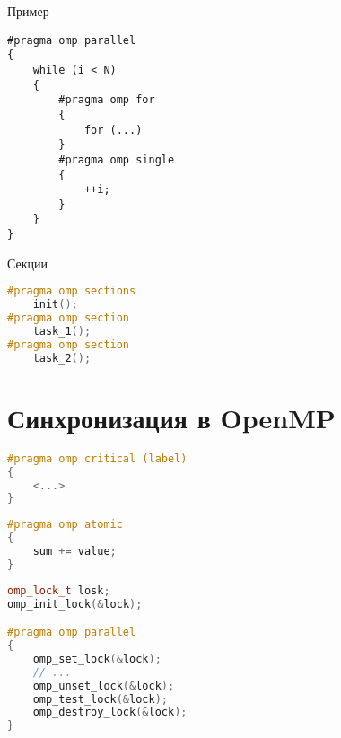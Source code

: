 \begin{frame}[fragile]{Пример}

\begin{lstlisting}
#pragma omp parallel
{
    while (i < N)
    {
        #pragma omp for
        {
            for (...)
        }
        #pragma omp single
        {
            ++i;
        }
    }
}
\end{lstlisting}

\end{frame}

\begin{frame}[fragile]{Секции}

\begin{lstlisting}[language=C++,basicstyle=\ttfamily,keywordstyle=\color{blue},basicstyle=\scriptsize]
#pragma omp sections
    init();
#pragma omp section
    task_1();
#pragma omp section
    task_2();
\end{lstlisting}

\end{frame}

\section{Синхронизация в OpenMP}

\begin{frame}[fragile]

\begin{lstlisting}[language=C++,basicstyle=\ttfamily,keywordstyle=\color{blue},basicstyle=\scriptsize]
#pragma omp critical (label)
{
    <...>
}
\end{lstlisting}

\end{frame}

\begin{frame}[fragile]

\begin{lstlisting}[language=C++,basicstyle=\ttfamily,keywordstyle=\color{blue},basicstyle=\scriptsize]
#pragma omp atomic
{
    sum += value;
}
\end{lstlisting}

\end{frame}

\begin{frame}[fragile]

\begin{lstlisting}[language=C++,basicstyle=\ttfamily,keywordstyle=\color{blue},basicstyle=\scriptsize]
omp_lock_t losk;
omp_init_lock(&lock);

#pragma omp parallel
{
    omp_set_lock(&lock);
    // ...
    omp_unset_lock(&lock);
    omp_test_lock(&lock);
    omp_destroy_lock(&lock);
}
\end{lstlisting}

\end{frame}

